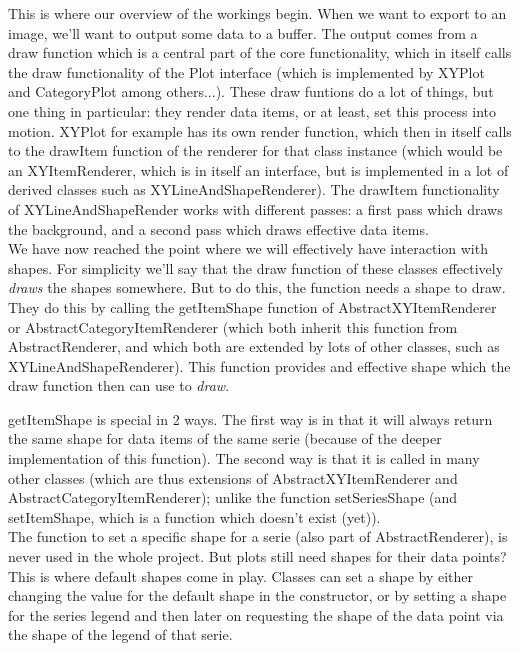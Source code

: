 \documentclass{article}
\begin{document}
This is where our overview of the workings begin. When we want to export to an image, we'll want to output some data to a buffer. The output comes from a draw function which is a central part of the core functionality, which in itself calls the draw functionality of the Plot interface (which is implemented by XYPlot and CategoryPlot among others...). These draw funtions do a lot of things, but one thing in particular: they render data items, or at least, set this process into motion. XYPlot for example has its own render function, which then in itself calls to the drawItem function of the renderer for that class instance (which would be an XYItemRenderer, which is in itself an interface, but is implemented in a lot of derived classes such as XYLineAndShapeRenderer). The drawItem functionality of XYLineAndShapeRender works with different passes: a first pass which draws the background, and a second pass which draws effective data items.\\

We have now reached the point where we will effectively have interaction with shapes. For simplicity we'll say that the draw function of these classes effectively \textit{draws} the shapes somewhere. But to do this, the function needs a shape to draw. They do this by calling the getItemShape function of AbstractXYItemRenderer or AbstractCategoryItemRenderer (which both inherit this function from AbstractRenderer, and which both are extended by lots of other classes, such as XYLineAndShapeRenderer). This function provides and effective shape which the draw function then can use to \textit{draw}.

getItemShape is special in 2 ways. The first way is in that it will always return the same shape for data items of the same serie (because of the deeper implementation of this function). The second way is that it is called in many other classes (which are thus extensions of AbstractXYItemRenderer and AbstractCategoryItemRenderer); unlike the function setSeriesShape (and setItemShape, which is a function which doesn't exist (yet)).\\

The function to set a specific shape for a serie (also part of AbstractRenderer), is never used in the whole project. But plots still need shapes for their data points? This is where default shapes come in play. Classes can set a shape by either changing the value for the default shape in the constructor, or by setting a shape for the series legend and then later on requesting the shape of the data point via the shape of the legend of that serie. 
\end{document}
